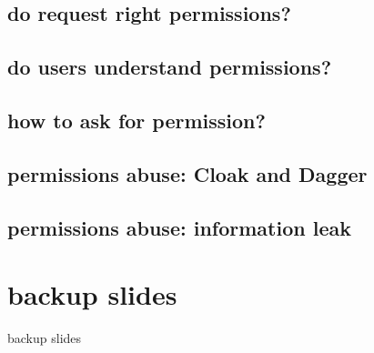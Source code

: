 \subsection{do request right permissions?}


\subsection{do users understand permissions?}


\subsection{how to ask for permission?}


\subsection{permissions abuse: Cloak and Dagger}


\subsection{permissions abuse: information leak}



\section{backup slides}
\begin{frame}{backup slides}
\end{frame}


